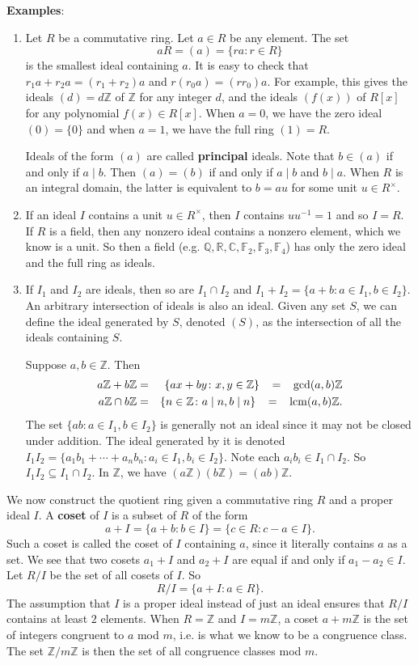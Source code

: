 \documentclass{article}
\def\Z{{\mathbb Z}}
\def\lcm{{\rm lcm}}
\def\R{{\mathbb R}}
\def\F{{\mathbb F}}
\def\Q{{\mathbb Q}}
\def\Z{{\mathbb Z}}
\def\F{{\mathbb F}}
\def\Q{{\mathbb Q}}
\def\C{{\mathbb C}}
\begin{document}
\vspace{5pt}
\noindent\textbf{Examples}:
\begin{enumerate}
    \item Let $R$ be a commutative ring. Let $a\in R$ be any element. The set
    $$aR = (a) = \{ra\colon r\in R\}$$
    is the smallest ideal containing $a$. It is easy to check that $r_1a + r_2a = (r_1+r_2)a$ and $r(r_0a) = (rr_0)a$. For example, this gives the ideals $(d) = d\Z$ of $\Z$ for any integer $d$, and the ideals $(f(x))$ of $R[x]$ for any polynomial $f(x)\in R[x]$. When $a = 0$, we have the zero ideal $(0) = \{0\}$ and when $a = 1$, we have the full ring $(1) = R$. %


    Ideals of the form $(a)$ are called \textbf{principal} ideals. Note that $b\in (a)$ if and only if $a\mid b$. Then $(a) = (b)$ if and only if $a\mid b$ and $b\mid a$. When $R$ is an integral domain, the latter is equivalent to $b = au$ for some unit $u\in R^\times$.
    \item If an ideal $I$ contains a unit $u\in R^\times$, then $I$ contains $uu^{-1} = 1$ and so $I = R$. If $R$ is a field, then any nonzero ideal contains a nonzero element, which we know is a unit. So then a field (e.g. $\Q,\R,\C,\F_2,\F_3,\F_4$) has only the zero ideal and the full ring as ideals.
    \item If $I_1$ and $I_2$ are ideals, then so are $I_1\cap I_2$ and $I_1 + I_2 = \{a + b\colon a\in I_1, b\in I_2\}$. An arbitrary intersection of ideals is also an ideal. Given any set $S$, we can define the ideal generated by $S$, denoted $(S)$, as the intersection of all the ideals containing $S$.

    Suppose $a,b\in\Z$. Then 
    \begin{eqnarray*}
        a\Z + b\Z &=& \{ax + by\colon x,y\in\Z\}\quad\! =\quad\! \gcd(a,b)\Z\\
        a\Z\cap b\Z &=& \{n\in\Z\colon a\mid n,b\mid n\}\quad\! =\quad \!\lcm(a,b)\Z.
    \end{eqnarray*}
    The set $\{ab\colon a\in I_1, b\in I_2\}$ is generally not an ideal since it may not be closed under addition. The ideal generated by it is denoted $I_1I_2 = \{a_1b_1 + \cdots + a_nb_n\colon a_i\in I_1, b_i\in I_2\}.$ Note each $a_ib_i\in I_1\cap I_2$. So $I_1I_2\subseteq I_1\cap I_2$. In $\Z$, we have $(a\Z)(b\Z) = (ab)\Z$.
\end{enumerate}
We now construct the quotient ring given a commutative ring $R$ and a proper ideal $I$. A \textbf{coset} of $I$ is a subset of $R$ of the form $$a + I = \{a + b\colon b\in I\} = \{c\in R\colon c - a\in I\}.$$ Such a coset is called the coset of $I$ containing $a$, since it literally contains $a$ as a set. We see that two cosets $a_1 + I$ and $a_2 + I$ are equal if and only if $a_1 - a_2 \in I$. Let $R/I$ be the set of all cosets of $I$. So 
$$R/I = \{a + I\colon a\in R\}.$$
The assumption that $I$ is a proper ideal instead of just an ideal ensures that $R/I$ contains at least $2$ elements. When $R = \Z$ and $I = m\Z$, a coset $a + m\Z$ is the set of integers congruent to $a$ mod $m$, i.e. is what we know to be a congruence class. The set $\Z/m\Z$ is then the set of all congruence classes mod $m$.
\end{document}
